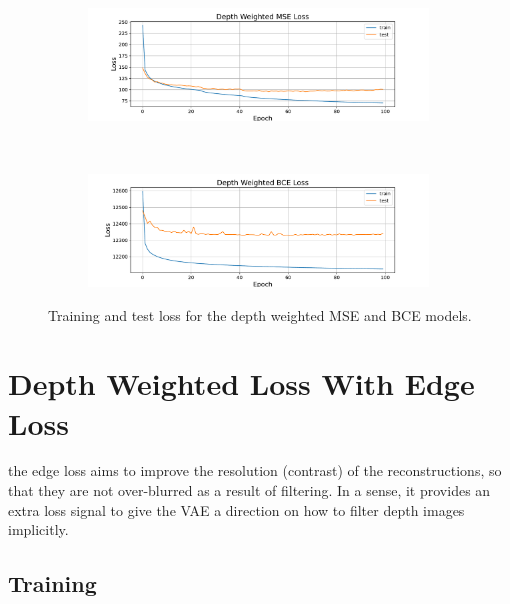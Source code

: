 \begin{figure}[htb]
    \centering
    \begin{subfigure}[b]{\textwidth}
        \centering
        \captionsetup{justification=centering}
        \includegraphics[width=0.99\textwidth]{figures/8_/2_final_MSE_depth_weighted10.pdf}
        \label{fig:2_final_MSE_depth_weighted10}
    \end{subfigure} \\
    \begin{subfigure}[b]{\textwidth}
        \centering
        \captionsetup{justification=centering}
        \includegraphics[width=0.99\textwidth]{figures/8_/5_final_BCE_depth_weighted10.pdf}
        \label{fig:5_final_BCE_depth_weighted10}
    \end{subfigure} 
    \caption{Training and test loss for the depth weighted MSE and BCE models.}
    \label{fig:8_depth_vae}
\end{figure}



\section{Depth Weighted Loss With Edge Loss}
\label{sec:8_edge_depth}
the edge loss aims to improve the resolution (contrast) of the reconstructions, so that they are not over-blurred as a result of filtering. In a sense, it provides an extra loss signal to give the VAE a direction on how to filter depth images implicitly.

\subsection{Training}

